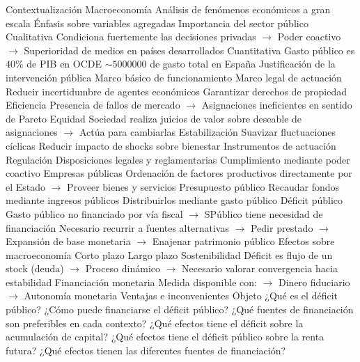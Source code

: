 \documentclass{nuevotema}
\begin{document}
\esquemalargo


\begin{esquemal}
	\1[] 
		\2 Contextualización
			\3 Macroeconomía
				\4 Análisis de fenómenos económicos a gran escala
				\4 Énfasis sobre variables agregadas
			\3 Importancia del sector público
				\4 Cualitativa
				\4[] Condiciona fuertemente las decisiones privadas
				\4[] $\to$ Poder coactivo
				\4[] $\to$ Superioridad de medios en países desarrollados
				\4 Cuantitativa
				\4[] Gasto público es 40\% de PIB en OCDE
				\4[] $\sim 5000000$ de gasto total en España
			\3 Justificación de la intervención pública
				\4 Marco básico de funcionamiento
				\4[] Marco legal de actuación
				\4[] Reducir incertidumbre de agentes económicos
				\4[] Garantizar derechos de propiedad
				\4 Eficiencia
				\4[] Presencia de fallos de mercado
				\4[] $\to$ Asignaciones ineficientes en sentido de Pareto
				\4 Equidad
				\4[] Sociedad realiza juicios de valor
				\4[] sobre deseable de asignaciones
				\4[] $\to$ Actúa para cambiarlas
				\4 Estabilización
				\4[] Suavizar fluctuaciones cíclicas
				\4[] Reducir impacto de shocks sobre bienestar
			\3 Instrumentos de actuación
				\4 Regulación
				\4[] Disposiciones legales y reglamentarias
				\4[] Cumplimiento mediante poder coactivo
				\4 Empresas públicas
				\4[] Ordenación de factores productivos
				\4[] directamente por el Estado
				\4[] $\to$ Proveer bienes y servicios
				\4 Presupuesto público
				\4[] Recaudar fondos mediante ingresos públicos
				\4[] Distribuirlos mediante gasto público
			\3 Déficit público
				\4 Gasto público no financiado por vía fiscal
				\4[] $\to$ SPúblico tiene necesidad de financiación
				\4 Necesario recurrir a fuentes alternativas
				\4[] $\to$ Pedir prestado
				\4[] $\to$ Expansión de base monetaria
				\4[] $\to$ Enajenar patrimonio público
				\4 Efectos sobre macroeconomía
				\4[] Corto plazo
				\4[] Largo plazo
				\4 Sostenibilidad
				\4[] Déficit es flujo de un stock (deuda)
				\4[] $\to$ Proceso dinámico
				\4[] $\to$ Necesario valorar convergencia hacia estabilidad
				\4 Financiación monetaria
				\4[] Medida disponible con:
				\4[] $\to$ Dinero fiduciario
				\4[] $\to$ Autonomía monetaria
				\4[] Ventajas e inconvenientes
		\2 Objeto
			\3 ¿Qué es el déficit público?
			\3 ¿Cómo puede financiarse el déficit público?
			\3 ¿Qué fuentes de financiación son preferibles en cada contexto?
			\3 ¿Qué efectos tiene el déficit sobre la acumulación de capital?
			\3 ¿Qué efectos tiene el déficit público sobre la renta futura?
			\3 ¿Qué efectos tienen las diferentes fuentes de financiación?

\end{esquemal}
\end{document}
